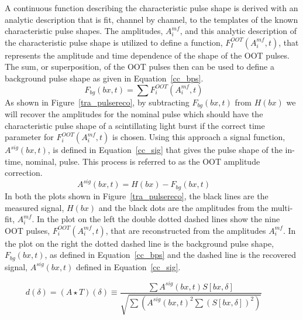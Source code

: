 A continuous function describing the characteristic pulse shape is derived with an analytic description that is fit, channel by channel, to the templates of the known characteristic pulse shapes. The amplitudes, $A^{mf}_{i}$, and this analytic description of the characteristic pulse shape is utilized to define a function, $F^{OOT}_{I}(A^{mf}_{i},t)$, that represents the amplitude and time dependence of the shape of the OOT pulses. The sum, or superposition, of the OOT pulses then can be used to define a background pulse shape as given in Equation~\ref{cc_bps}.
\begin{equation}\label{cc_bps}
F_{bg}(bx,t) = \sum F^{OOT}_{i}(A^{mf}_{i},t)\qquad
\end{equation}
As shown in Figure~\ref{tra_pulsereco}, by subtracting $F_{bg}(bx,t)$ from $H(bx)$ we will recover the amplitudes for the nominal pulse which should have the characteristic pulse shape of a scintillating light burst if the correct time parameter for $F^{OOT}_{i}(A^{mf}_{i},t)$ is chosen. Using this approach a signal function, $A^{sig}(bx,t)$, is defined in Equation~\ref{cc_sig} that gives the pulse shape of the in-time, nominal, pulse.  This process is referred to as the OOT amplitude correction.
\begin{equation}\label{cc_sig}
A^{sig}(bx,t) = H(bx) - F_{bg}(bx,t)\qquad
\end{equation}
In both the plots shown in Figure~\ref{tra_pulsereco}, the black lines are the measured signal, $H(bx)$ and the black dots are the amplitudes from the multi-fit, $A^{mf}_{i}$. In the plot on the left the double dotted dashed lines show the nine OOT pulses, $F^{OOT}_{i}(A^{mf}_{i},t)$, that are reconstructed from the amplitudes $A^{mf}_{i}$. In the plot on the right the dotted dashed line is the background pulse shape, $F_{bg}(bx,t)$, as defined in Equation~\ref{cc_bps} and the dashed line is the recovered signal, $A^{sig}(bx,t)$ defined in Equation~\ref{cc_sig}.

\begin{equation}\label{cc_delta}
d(\delta) = (A \star T)(\delta) \equiv \frac{\sum A^{sig}(bx,t)S[bx,\delta]}{\sqrt{\sum (A^{sig}(bx,t)^2 \sum (S[bx,\delta])^2)}}\qquad
\end{equation}

